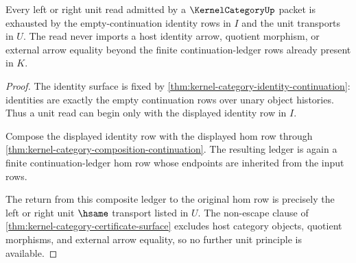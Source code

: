 \begin{theorem}
\label{thm:kernel-category-unit-scope}
Every left or right unit read admitted by a $\KernelCategoryUp$ packet is exhausted by the empty-continuation identity rows in $I$ and the unit transports in $U$. The read never imports a host identity arrow, quotient morphism, or external arrow equality beyond the finite continuation-ledger rows already present in $K$.
\end{theorem}
\begin{proof}
The identity surface is fixed by \autoref{thm:kernel-category-identity-continuation}: identities are exactly the empty continuation rows over unary object histories. Thus a unit read can begin only with the displayed identity row in $I$.

Compose the displayed identity row with the displayed hom row through \autoref{thm:kernel-category-composition-continuation}. The resulting ledger is again a finite continuation-ledger hom row whose endpoints are inherited from the input rows.

The return from this composite ledger to the original hom row is precisely the left or right unit $\hsame$ transport listed in $U$. The non-escape clause of \autoref{thm:kernel-category-certificate-surface} excludes host category objects, quotient morphisms, and external arrow equality, so no further unit principle is available.
\end{proof}

